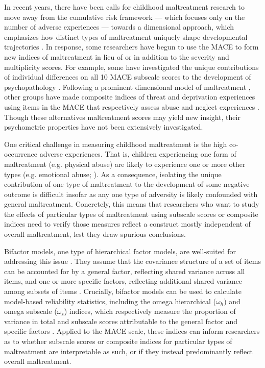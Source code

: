 \documentclass[letterpaper,man,natbib]{apa6}  %
\begin{document}
In recent years, there have been calls for childhood maltreatment research to move away from the cumulative risk framework \citep{evans2013cumulative} --- which focuses only on the number of adverse experiences --- towards a dimensional approach, which emphasizes how distinct types of maltreatment uniquely shape developmental trajectories \citep{mclaughlin2016beyond, belsky2012beyond}. In response, some researchers have begun to use the MACE to form new indices of maltreatment in lieu of or in addition to the severity and multiplicity scores. For example, some have investigated the unique contributions of individual differences on all 10 MACE subscale scores to the development of psychopathology \citep{schalinski2015type, gerke2018childhood, schalinski2019early}. Following a prominent dimensional model of maltreatment \citep{mclaughlin2014childhood}, other groups have made composite indices of threat and deprivation experiences using items in the MACE that respectively assess abuse and neglect experiences \citep{schalinski2018defining, schalinski2019environmental, teicher2018differential}. Though these alternatives maltreatment scores may yield new insight, their psychometric properties have not been extensively investigated.   

One critical challenge in measuring childhood maltreatment is the high co-occurrence adverse experiences. That is, children experiencing one form of maltreatment (e.g. physical abuse) are likely to experience one or more other types (e.g. emotional abuse; \citealt{green2010childhood, mclaughlin2012childhood, marques2021risk, mersky2017rethinking}). As a consequence, isolating the unique contribution of one type of maltreatment to the development of some negative outcome is difficult insofar as any one type of adversity is likely confounded with general maltreatment. Concretely, this means that researchers who want to study the effects of particular types of maltreatment using subscale scores or composite indices need to verify those measures reflect a construct mostly independent of overall maltreatment, lest they draw spurious conclusions.

Bifactor models, one type of hierarchical factor models, are well-suited for addressing this issue \citep{bornovalova2020appropriate}. They assume that the covariance structure of a set of items can be accounted for by a general factor, reflecting shared variance across all items, and one or more specific factors, reflecting additional shared variance among subsets of items \citep{Reise2012-ql}. Crucially, bifactor models can be used to calculate model-based reliability statistics, including the omega hierarchical ($\omega_h$) and omega subscale ($\omega_s$) indices, which respectively measure the proportion of variance in total and subscale scores attributable to the general factor and specific factors \citep{reise2013applying, rodriguez2016evaluating}. Applied to the MACE scale, these indices can inform researchers as to whether subscale scores or composite indices for particular types of maltreatment are interpretable as such, or if they instead predominantly reflect overall maltreatment. 
\end{document}
